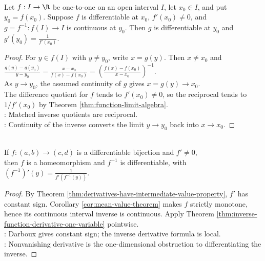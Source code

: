 \begin{theorem} \label{thm:inverse-function-derivative-one-variable} \\
Let $f:I\to\R$ be one-to-one on an open interval $I$, let $x_0\in I$, and put $y_0=f(x_0)$. Suppose $f$ is differentiable at $x_0$, $f'(x_0)\neq0$, and $g=f^{-1}:f(I)\to I$ is continuous at $y_0$. Then $g$ is differentiable at $y_0$ and $g'(y_0)=\frac{1}{f'(x_0)}$.
\begin{proof}
For $y\in f(I)$ with $y\neq y_0$, write $x=g(y)$. Then $x\neq x_0$ and $\frac{g(y)-g(y_0)}{y-y_0} =\frac{x-x_0}{f(x)-f(x_0)} =\left(\frac{f(x)-f(x_0)}{x-x_0}\right)^{-1}$.\\
As $y\to y_0$, the assumed continuity of $g$ gives $x=g(y)\to x_0$.\\
The difference quotient for $f$ tends to $f'(x_0)\neq0$, so the reciprocal tends to $1/f'(x_0)$ by Theorem \ref{thm:function-limit-algebra}.\\
: Matched inverse quotients are reciprocal.\\
: Continuity of the inverse converts the limit $y\to y_0$ back into $x\to x_0$.
\end{proof}
\end{theorem}

\begin{corollary} \label{cor:one-dimensional-inverse-function-theorem} \\
If $f:(a,b)\to(c,d)$ is a differentiable bijection and $f'\neq0$,\\
then $f$ is a homeomorphism and $f^{-1}$ is differentiable, with $(f^{-1})'(y)=\frac{1}{f'(f^{-1}(y))}$.
\begin{proof}
By Theorem \ref{thm:derivatives-have-intermediate-value-property}, $f'$ has constant sign. Corollary \ref{cor:mean-value-theorem} makes $f$ strictly monotone, hence its continuous interval inverse is continuous. Apply Theorem \ref{thm:inverse-function-derivative-one-variable} pointwise.\\
: Darboux gives constant sign; the inverse derivative formula is local.\\
: Nonvanishing derivative is the one-dimensional obstruction to differentiating the inverse.
\end{proof}
\end{corollary}


